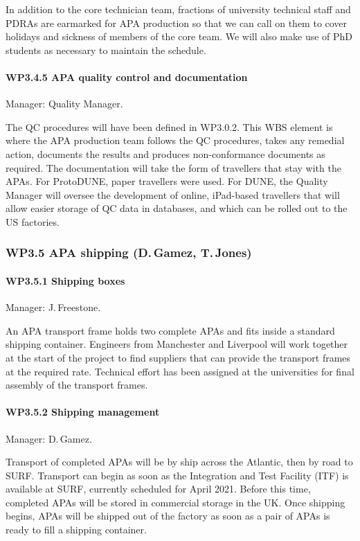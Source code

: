 In addition to the core technician team, fractions of university technical staff and PDRAs are earmarked for APA production so that we can call on them to cover holidays and sickness of members of the core team. We will also make use of PhD students as necessary to maintain the schedule.

\paragraph{WP3.4.5 APA quality control and documentation} Manager: Quality Manager.

The QC procedures will have been defined in WP3.0.2. This WBS element is where the APA production team follows the QC procedures, takes any remedial action, documents the results and produces non-conformance documents as required. The documentation will take the form of travellers that stay with the APAs. For ProtoDUNE, paper travellers were used. For DUNE, the Quality Manager will oversee the development of online, iPad-based travellers that will allow easier storage of QC data in databases, and which can be rolled out to the US factories.

\subsubsection{WP3.5 APA shipping (D.\,Gamez, T.\,Jones)}

\paragraph{WP3.5.1 Shipping boxes} Manager: J.\,Freestone.

An APA transport frame holds two complete APAs and fits inside a standard shipping container. Engineers from Manchester and Liverpool will work together at the start of the project to find suppliers that can provide the transport frames at the required rate. Technical effort has been assigned at the universities for final assembly of the transport frames.


\paragraph{WP3.5.2 Shipping management} Manager: D.\,Gamez.

Transport of completed APAs will be by ship across the Atlantic, then by road to SURF. Transport can begin as soon as the Integration and Test Facility (ITF) is available at SURF, currently scheduled for April 2021. Before this time, completed APAs will be stored in commercial storage in the UK. Once shipping begins, APAs will be shipped out of the factory as soon as a pair of APAs is ready to fill a shipping container.

